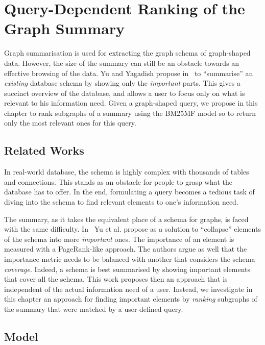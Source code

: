 \chapter{Query-Dependent Ranking of the Graph Summary}
\label{chap:summary-ranking}

Graph summarisation is used for extracting the graph schema of graph-shaped data. However, the size of the summary can still be an obstacle towards an effective browsing of the data. Yu and Yagadish propose in~\cite{yu:2006:schema-summarization} to ``summarise'' an \emph{existing} database schema by showing only the \emph{important} parts. This gives a succinct overview of the database, and allows a user to focus only on what is relevant to his information need. Given a graph-shaped query, we propose in this chapter to rank subgraphs of a summary using the \gls{BM25MF} model so to return only the most relevant ones for this query.

\section{Related Works}
\label{chap:summary-ranking:relworks}

In real-world database, the schema is highly complex with thousands of tables and connections. This stands as an obstacle for people to grasp what the database has to offer. In the end, formulating a query becomes a tedious task of diving into the schema to find relevant elements to one's information need.

The summary, as it takes the equivalent place of a schema for graphs, is faced with the same difficulty. In~\cite{yu:2006:schema-summarization} Yu et al. propose as a solution to ``collapse'' elements of the schema into more \emph{important} ones. The importance of an element is measured with a PageRank-like approach. The authors argue as well that the importance metric needs to be balanced with another that considers the schema \emph{coverage}. Indeed, a schema is best summarised by showing important elements that cover all the schema. This work proposes then an approach that is independent of the actual information need of a user. Instead, we investigate in this chapter an approach for finding important elements by \emph{ranking} subgraphs of the summary that were matched by a user-defined query.

\section{Model}
\label{chap:summary-ranking:model}

